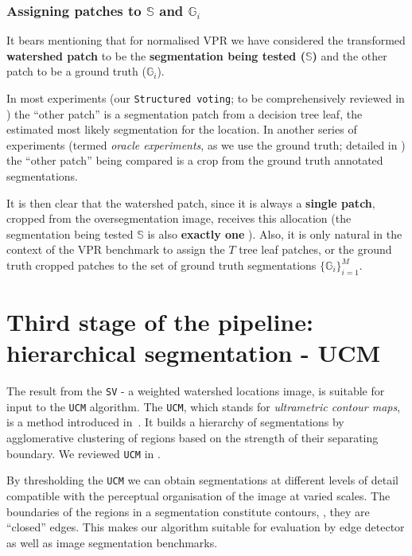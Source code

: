 
\subsubsection{Assigning patches to \texorpdfstring{$\mathbb{S}$}{S} and \texorpdfstring{$\mathbb{G}_i$}{G}}
\label{sec:ch4-asymmetry-VPR-assigning-patches-S-G}
It bears mentioning %
that for normalised VPR we have considered the transformed \textbf{watershed patch} to be the \textbf{segmentation being tested %
($\mathbb{S}$)} and the other patch to be a ground truth ($\mathbb{G}_i$). 

In most experiments (our {\tt Structured voting}; to be comprehensively %
reviewed in ) the ``other patch'' is a segmentation patch from a decision tree leaf, the estimated %
most likely segmentation for the location. In another series of experiments (termed {\it oracle experiments}, as we use the ground truth; detailed in ) the ``other patch'' being compared is a crop from the ground truth annotated segmentations. 

It is then clear that the watershed patch, since it is always a {\bf single patch}, cropped from the oversegmentation image, receives this allocation (the segmentation being tested $\mathbb{S}$ is also {\bf exactly one} %
). Also, it is only natural in the context of the VPR benchmark to assign the $T$ tree leaf patches, or the ground truth cropped patches to the set of ground truth segmentations $\{\mathbb{G}_i\}_{i=1}^M$.

\section[Third stage of the pipeline: UCM]{Third stage of the pipeline: hierarchical segmentation - UCM}
The result from the {\tt SV} - a weighted watershed locations image, is suitable for input to the {\tt UCM} algorithm. The {\tt UCM}, which stands for {\it ultrametric contour maps}, is a method introduced in~\cite{Arbelaez2006boundary}. It builds a hierarchy of segmentations by agglomerative clustering of regions based on the strength of their separating boundary. We reviewed {\tt UCM} in . 

By thresholding the {\tt UCM} we can obtain segmentations at different levels of detail compatible with the perceptual organisation of the image at varied scales. The boundaries of the regions in a segmentation constitute contours, \ie, they are ``closed'' edges. This makes our algorithm suitable for evaluation by edge detector as well as image segmentation benchmarks.

